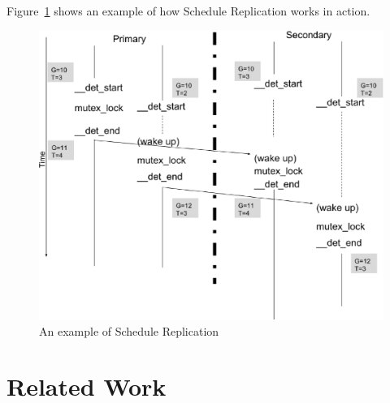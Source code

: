 Figure~\ref{f:scherep} shows an example of how Schedule Replication works in action.

\begin{figure}
\centering
\includegraphics[width=0.9\columnwidth]{figures/sched_rep}
\caption{An example of Schedule Replication}
\label{f:scherep}
\end{figure}

\section{Related Work}


